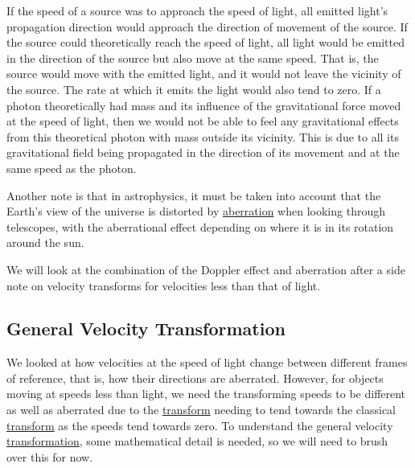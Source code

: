 
If the speed of a source was to approach the speed of light, all emitted light's propagation direction would approach the direction of movement of the source.
If the source could theoretically reach the speed of light, all light would be emitted in the direction of the source but also move at the same speed.
That is, the source would move with the emitted light, and it would not leave the vicinity of the source.
The rate at which it emits the light would also tend to zero.
If a photon theoretically had mass and its influence of the gravitational force moved at the speed of light, then we would not be able to feel any gravitational effects from this theoretical photon with mass outside its vicinity.
This is due to all its gravitational field being propagated in the direction of its movement and at the same speed as the photon.

Another note is that in astrophysics, it must be taken into account that the Earth's view of the universe is distorted by \hyperlink{def-aberration}{aberration} when looking through telescopes, with the aberrational effect depending on where it is in its rotation around the sun.

We will look at the combination of the Doppler effect and aberration after a side note on velocity transforms for velocities less than that of light.


\subsection{General Velocity Transformation}

We looked at how velocities at the speed of light change between different frames of reference, that is, how their directions are aberrated.
However, for objects moving at speeds less than light, we need the transforming speeds to be different as well as aberrated due to the \hyperlink{def-transform}{transform} needing to tend towards the classical \hyperlink{def-transform}{transform} as the speeds tend towards zero.
To understand the general velocity \hyperlink{def-transform}{transformation}, some mathematical detail is needed, so we will need to brush over this for now.

